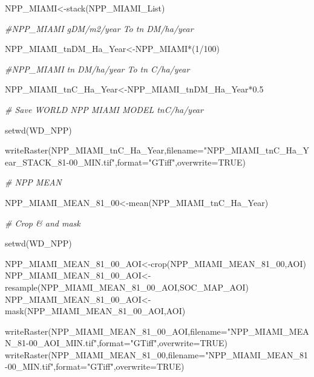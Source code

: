 \documentclass[
  10pt,
  b5paper,
]{book}
\newenvironment{Shaded}{\begin{snugshade}}{\end{snugshade}}
\newcommand{\AttributeTok}[1]{\textcolor[rgb]{0.77,0.63,0.00}{#1}}
\newcommand{\CommentTok}[1]{\textcolor[rgb]{0.56,0.35,0.01}{\textit{#1}}}
\newcommand{\ConstantTok}[1]{\textcolor[rgb]{0.00,0.00,0.00}{#1}}
\newcommand{\DecValTok}[1]{\textcolor[rgb]{0.00,0.00,0.81}{#1}}
\newcommand{\FloatTok}[1]{\textcolor[rgb]{0.00,0.00,0.81}{#1}}
\newcommand{\FunctionTok}[1]{\textcolor[rgb]{0.00,0.00,0.00}{#1}}
\newcommand{\NormalTok}[1]{#1}
\newcommand{\OtherTok}[1]{\textcolor[rgb]{0.56,0.35,0.01}{#1}}
\newcommand{\SpecialCharTok}[1]{\textcolor[rgb]{0.00,0.00,0.00}{#1}}
\newcommand{\StringTok}[1]{\textcolor[rgb]{0.31,0.60,0.02}{#1}}
\begin{document}
\begin{Shaded}
\begin{Highlighting}[]
\NormalTok{NPP\_MIAMI}\OtherTok{\textless{}{-}}\FunctionTok{stack}\NormalTok{(NPP\_MIAMI\_List)}

\CommentTok{\#NPP\_MIAMI gDM/m2/year To tn DM/ha/year}

\NormalTok{NPP\_MIAMI\_tnDM\_Ha\_Year}\OtherTok{\textless{}{-}}\NormalTok{NPP\_MIAMI}\SpecialCharTok{*}\NormalTok{(}\DecValTok{1}\SpecialCharTok{/}\DecValTok{100}\NormalTok{)}

\CommentTok{\#NPP\_MIAMI tn DM/ha/year To tn C/ha/year}

\NormalTok{NPP\_MIAMI\_tnC\_Ha\_Year}\OtherTok{\textless{}{-}}\NormalTok{NPP\_MIAMI\_tnDM\_Ha\_Year}\SpecialCharTok{*}\FloatTok{0.5}

\CommentTok{\# Save WORLD NPP MIAMI MODEL tnC/ha/year}

\FunctionTok{setwd}\NormalTok{(WD\_NPP)}

\FunctionTok{writeRaster}\NormalTok{(NPP\_MIAMI\_tnC\_Ha\_Year,}\AttributeTok{filename=}\StringTok{"NPP\_MIAMI\_tnC\_Ha\_Year\_STACK\_81{-}00\_MIN.tif"}\NormalTok{,}\AttributeTok{format=}\StringTok{"GTiff"}\NormalTok{,}\AttributeTok{overwrite=}\ConstantTok{TRUE}\NormalTok{)}

\CommentTok{\# NPP MEAN}

\NormalTok{NPP\_MIAMI\_MEAN\_81\_00}\OtherTok{\textless{}{-}}\FunctionTok{mean}\NormalTok{(NPP\_MIAMI\_tnC\_Ha\_Year)}

\CommentTok{\# Crop \& and mask}

\FunctionTok{setwd}\NormalTok{(WD\_NPP)}

\NormalTok{NPP\_MIAMI\_MEAN\_81\_00\_AOI}\OtherTok{\textless{}{-}}\FunctionTok{crop}\NormalTok{(NPP\_MIAMI\_MEAN\_81\_00,AOI)}
\NormalTok{NPP\_MIAMI\_MEAN\_81\_00\_AOI}\OtherTok{\textless{}{-}}\FunctionTok{resample}\NormalTok{(NPP\_MIAMI\_MEAN\_81\_00\_AOI,SOC\_MAP\_AOI)}
\NormalTok{NPP\_MIAMI\_MEAN\_81\_00\_AOI}\OtherTok{\textless{}{-}}\FunctionTok{mask}\NormalTok{(NPP\_MIAMI\_MEAN\_81\_00\_AOI,AOI)}

\FunctionTok{writeRaster}\NormalTok{(NPP\_MIAMI\_MEAN\_81\_00\_AOI,}\AttributeTok{filename=}\StringTok{"NPP\_MIAMI\_MEAN\_81{-}00\_AOI\_MIN.tif"}\NormalTok{,}\AttributeTok{format=}\StringTok{"GTiff"}\NormalTok{,}\AttributeTok{overwrite=}\ConstantTok{TRUE}\NormalTok{)}
\FunctionTok{writeRaster}\NormalTok{(NPP\_MIAMI\_MEAN\_81\_00,}\AttributeTok{filename=}\StringTok{"NPP\_MIAMI\_MEAN\_81{-}00\_MIN.tif"}\NormalTok{,}\AttributeTok{format=}\StringTok{"GTiff"}\NormalTok{,}\AttributeTok{overwrite=}\ConstantTok{TRUE}\NormalTok{)}



\end{Highlighting}
\end{Shaded}
\end{document}
